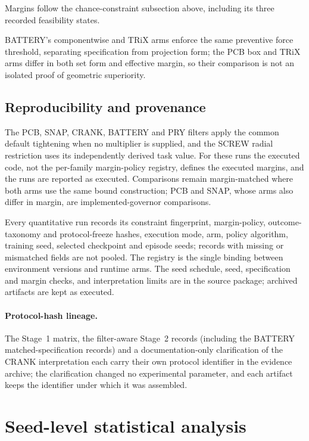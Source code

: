 \documentclass[10pt]{article}
\begin{document}
Margins follow the chance-constraint subsection above, including its three recorded feasibility states.


BATTERY's componentwise and TRiX arms enforce the same preventive force
threshold, separating specification from projection form; the PCB
box and TRiX arms differ in both set form and effective margin, so their
comparison is not an isolated proof of geometric superiority.


\subsection{Reproducibility and provenance}

The PCB, SNAP, CRANK, BATTERY and PRY filters apply the common default
tightening when no multiplier is supplied, and the SCREW radial restriction uses
its independently derived task value. For these runs the executed code, not the
per-family margin-policy registry, defines the executed margins, and the runs
are reported as executed.
Comparisons remain margin-matched where both arms use the same bound
construction; PCB and SNAP, whose arms also differ in margin, are
implemented-governor comparisons.

Every quantitative run records its constraint fingerprint, margin-policy,
outcome-taxonomy and protocol-freeze hashes, execution mode, arm, policy
algorithm, training seed, selected checkpoint and episode seeds; records with
missing or mismatched fields are not pooled. The registry is the single
binding between environment versions and runtime arms. The seed schedule,
seed, specification and margin checks, and interpretation limits are in the
source package; archived artifacts are kept as executed.


\paragraph{Protocol-hash lineage.}
The Stage~1 matrix, the filter-aware Stage~2 records (including the BATTERY matched-specification records) and a documentation-only clarification of the CRANK interpretation each carry their own protocol identifier
in the evidence archive; the clarification changed no experimental
parameter, and each artifact keeps the identifier under which it was
assembled.


\section{Seed-level statistical analysis}
\end{document}
